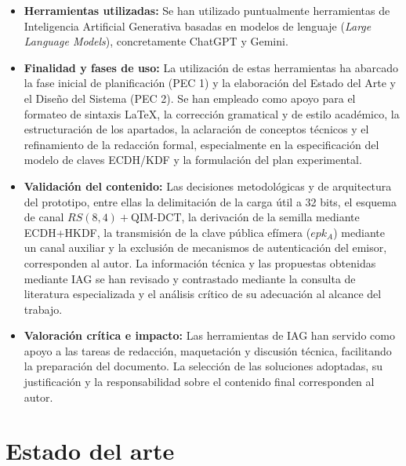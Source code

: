 \documentclass[IB]{TFUOC}%
\begin{document}
\begin{itemize}
    \item \textbf{Herramientas utilizadas:} Se han utilizado puntualmente herramientas de Inteligencia Artificial Generativa basadas en modelos de lenguaje (\textit{Large Language Models}), concretamente ChatGPT y Gemini.

    \item \textbf{Finalidad y fases de uso:} La utilización de estas herramientas ha abarcado la fase inicial de planificación (PEC 1) y la elaboración del Estado del Arte y el Diseño del Sistema (PEC 2). Se han empleado como apoyo para el formateo de sintaxis LaTeX, la corrección gramatical y de estilo académico, la estructuración de los apartados, la aclaración de conceptos técnicos y el refinamiento de la redacción formal, especialmente en la especificación del modelo de claves ECDH/KDF y la formulación del plan experimental.

    \item \textbf{Validación del contenido:} Las decisiones metodológicas y de arquitectura del prototipo, entre ellas la delimitación de la carga útil a 32 bits, el esquema de canal $RS(8,4) + \mathrm{QIM\text{-}DCT}$, la derivación de la semilla mediante ECDH+HKDF, la transmisión de la clave pública efímera ($epk_A$) mediante un canal auxiliar y la exclusión de mecanismos de autenticación del emisor, corresponden al autor. La información técnica y las propuestas obtenidas mediante IAG se han revisado y contrastado mediante la consulta de literatura especializada y el análisis crítico de su adecuación al alcance del trabajo.

    \item \textbf{Valoración crítica e impacto:} Las herramientas de IAG han servido como apoyo a las tareas de redacción, maquetación y discusión técnica, facilitando la preparación del documento. La selección de las soluciones adoptadas, su justificación y la responsabilidad sobre el contenido final corresponden al autor.
\end{itemize}


\chapter{Estado del arte}
\end{document}
